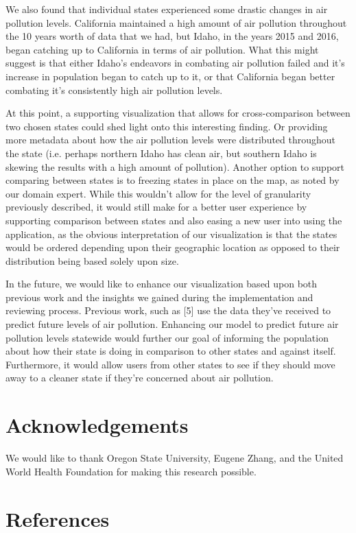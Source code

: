 \documentclass[journal]{vgtc}                %
\begin{document}
We also found that individual states experienced some drastic changes in air pollution levels. California maintained a high amount of air pollution
throughout the 10 years worth of data that we had, but Idaho, in the years 2015 and 2016, began catching up to California in terms of air pollution.
What this might suggest is that either Idaho's endeavors in combating air pollution failed and it's increase in population began to catch up
to it, or that California began better combating it's consistently high air pollution levels.  

At this point, a supporting visualization
that allows for cross-comparison between two chosen states could shed light onto this interesting finding. Or providing more metadata about
how the air pollution levels were distributed throughout the state (i.e. perhaps northern Idaho has clean air, but southern Idaho is skewing the
results with a high amount of pollution). Another option to support comparing between states is to freezing states in place on the map, as
noted by our domain expert. While this wouldn't allow for the level of granularity previously described, it would still make for a better
user experience by supporting comparison between states and also easing a new user into using the application, as the obvious
interpretation of our visualization is that the states would be ordered depending upon their geographic location as opposed to their distribution
being based solely upon size.

In the future, we would like to enhance our visualization based upon both previous work and the insights we gained during
the implementation and reviewing process. Previous work, such as [5] use the data they've received to predict future
levels of air pollution. Enhancing our model to predict future air pollution levels statewide would further our goal of informing
the population about how their state is doing in comparison to other states and against itself. Furthermore, it would allow
users from other states to see if they should move away to a cleaner state if they're concerned about air pollution. 

\section{Acknowledgements}

We would like to thank Oregon State University, Eugene Zhang, and the United World Health Foundation for
making this research possible.

\section{References}
\end{document}
